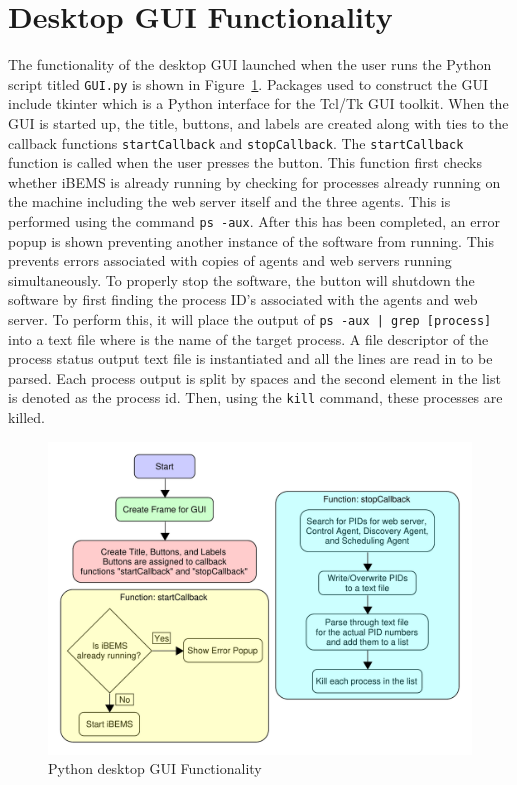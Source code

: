\section{Desktop GUI Functionality}
The functionality of the desktop GUI launched when the user runs the Python script titled \texttt{GUI.py} is shown in Figure~\ref{fig:desktopgui}. Packages used to construct the GUI include tkinter which is a Python interface for the Tcl/Tk GUI toolkit. When the GUI is started up, the title, buttons, and labels are created along with ties to the callback functions \texttt{startCallback} and \texttt{stopCallback}. The \texttt{startCallback} function is called when the user presses the  button. This function first checks whether iBEMS is already running by checking for processes already running on the machine including the web server itself and the three agents. This is performed using the command \texttt{ps -aux}. After this has been completed, an error popup is shown preventing another instance of the software from running. This prevents errors associated with copies of agents and web servers running simultaneously. To properly stop the software, the  button will shutdown the software by first finding the process ID's associated with the agents and web server. To perform this, it will place the output of \texttt{ps -aux | grep [process]} into a text file where  is the name of the target process. A file descriptor of the process status output text file is instantiated and all the lines are read in to be parsed. Each process output is split by spaces and the second element in the list is denoted as the process id. Then, using the \texttt{kill} command, these processes are killed. 
\begin{figure}[H]
    \centering
    \includegraphics[scale=0.6]{figs/GUI/GUI_Diagram.pdf}
    \caption{Python desktop GUI Functionality}
    \label{fig:desktopgui}
\end{figure}

